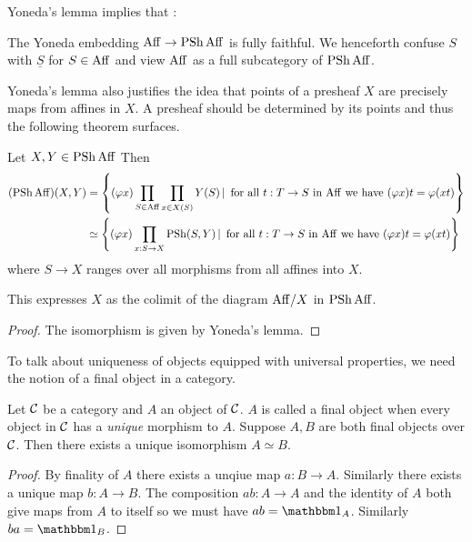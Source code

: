 \documentclass[./main.tex]{subfiles}
\begin{document}
Yoneda's lemma implies that : 
\begin{prop}
  
  The Yoneda embedding $\mathrm{Aff} \to \operatorname{PSh} \mathrm{Aff}$
  is fully faithful.
  We henceforth confuse $S$ with $\underline{S}$ for $S \in \mathrm{Aff}$
  and view $\mathrm{Aff}$ as a full subcategory of $\operatorname{PSh} \mathrm{Aff}$.
\end{prop}

Yoneda's lemma also justifies the idea that
points of a presheaf $X$ are precisely maps from affines in $X$.
A presheaf should be determined by its points
and thus the following theorem surfaces.

\begin{prop}
  
  Let $X , Y \in \operatorname{PSh} \mathrm{Aff}$
  Then  \begin{align*}
    (\operatorname{PSh} \mathrm{Aff})(X , Y) 
    &= \left\{ (\varphi x) \prod_{S \in \mathrm{Aff}} \prod_{x \in X(S)} Y(S)
    \,|\, \text{ for all $t : T \to S$ in $\mathrm{Aff}$ we have }
    (\varphi x) t = \varphi (x t)
    \right\} \\
    &\simeq \left\{ (\varphi x) \prod_{x : S \to X} \operatorname{PSh}(S , Y)
    \,|\, \text{ for all $t : T \to S$ in $\mathrm{Aff}$ we have }
    (\varphi x) t = \varphi (x t)\right\}
  \end{align*}
  where $S \to X$ ranges over all morphisms from all affines into $X$.
\end{prop}
This expresses $X$ as the colimit of
the diagram $\mathrm{Aff} / X$ in $\operatorname{PSh} \mathrm{Aff}$.
\begin{proof}
  The isomorphism is given by Yoneda's lemma.
\end{proof}
To talk about uniqueness of objects equipped with universal properties,
we need the notion of a final object in a category.
\begin{prop}
  
  Let $\mathcal{C}$ be a category and $A$ an object of $\mathcal{C}$.
  $A$ is called a final object when 
  every object in $\mathcal{C}$ has a \emph{unique} morphism to $A$.
  Suppose $A, B$ are both final objects over $\mathcal{C}$.
  Then there exists a unique isomorphism $A \simeq B$.
  
\end{prop}
\begin{proof}
  By finality of $A$ there exists a unqiue map $a : B \to A$.
  Similarly there exists a unique map $b : A \to B$.
  The composition $a b : A \to A$ and the identity of $A$
  both give maps from $A$ to itself so we must have
  $a b = \id_A$.
  Similarly $b a = \id_B$.
\end{proof}
\end{document}
